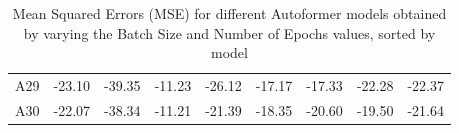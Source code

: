 \begin{table}[]
{\begin{tabular}{ccccccccc}
    A29   & \cellcolor[HTML]{63BE7B}-23.10 & \cellcolor[HTML]{8FCA7D}-39.35 & \cellcolor[HTML]{DEE182}-11.23 & \cellcolor[HTML]{95CC7D}-26.12 & \cellcolor[HTML]{D6DF81}-17.17 & \cellcolor[HTML]{FDB57A}-17.33 & \cellcolor[HTML]{99CD7E}-22.28 & \cellcolor[HTML]{63BE7B}-22.37 \\
    A30   & \cellcolor[HTML]{C4DA80}-22.07 & \cellcolor[HTML]{FFEA84}-38.34 & \cellcolor[HTML]{EDE582}-11.21 & \cellcolor[HTML]{FFE984}-21.39 & \cellcolor[HTML]{63BE7B}-18.35 & \cellcolor[HTML]{A2D07E}-20.60 & \cellcolor[HTML]{FED380}-19.50 & \cellcolor[HTML]{F7E883}-21.64
    \end{tabular}%
    }
    \caption{Mean Squared Errors (MSE) for different Autoformer models obtained by varying the Batch Size and Number of Epochs values, sorted by model}
    \label{A5_M}
    \end{table}



